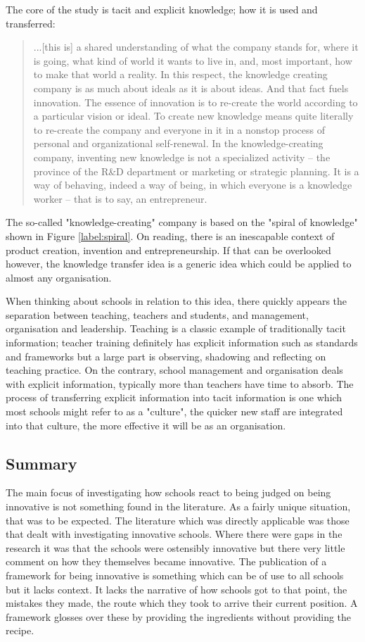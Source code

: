 The core of the study is tacit and explicit knowledge; how it is used and transferred:

\begin{quote}
...[this is] a shared understanding of what the company stands for, where it is going, what kind of world it wants to live in, and, most important, how to make that world a reality. In this respect, the knowledge creating company is as much about ideals as it is about ideas. And that fact fuels innovation. The essence of innovation is to re-create the world according to a particular vision or ideal. To create new knowledge means quite literally to re-create the company and everyone in it in a nonstop process of personal and organizational self-renewal. In the knowledge-creating company, inventing new knowledge is not a specialized activity – the province of the R\&D department or marketing or strategic planning. It is a way of behaving, indeed a way of being, in which everyone is a knowledge worker – that is to say, an entrepreneur.
\end{quote}

The so-called "knowledge-creating" company is based on the "spiral of knowledge" shown in Figure \ref{label:spiral}. On reading, there is an inescapable context of product creation, invention and entrepreneurship. If that can be overlooked however, the knowledge transfer idea is a generic idea which could be applied to almost any organisation.

When thinking about schools in relation to this idea, there quickly appears the separation between teaching, teachers and students, and management, organisation and leadership. Teaching is a classic example of traditionally tacit information; teacher training definitely has explicit information such as standards and frameworks but a large part is observing, shadowing and reflecting on teaching practice. On the contrary, school management and organisation deals with explicit information, typically more than teachers have time to absorb. The process of transferring explicit information into tacit information is one which most schools might refer to as a "culture", the quicker new staff are integrated into that culture, the more effective it will be as an organisation.

\subsection{Summary}
The main focus of investigating how schools react to being judged on being innovative is not something found in the literature. As a fairly unique situation, that was to be expected. The literature which was directly applicable was those that dealt with investigating innovative schools. Where there were gaps in the research it was that the schools were ostensibly innovative but there very little comment on how they themselves became innovative. The publication of a framework for being innovative is something which can be of use to all schools but it lacks context. It lacks the narrative of how schools got to that point, the mistakes they made, the route which they took to arrive their current position. A framework glosses over these by providing the ingredients without providing the recipe.

